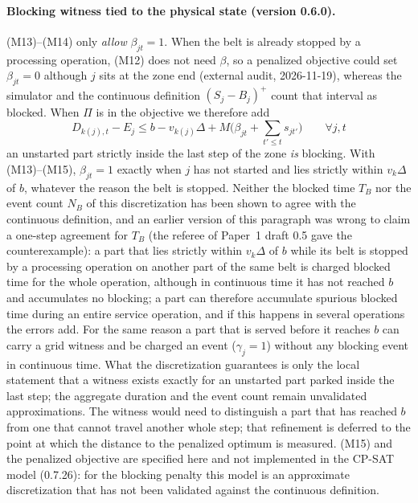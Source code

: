 \documentclass[11pt,a4paper]{article}
\theoremstyle{definition}
\theoremstyle{remark}
\begin{document}
\paragraph{Blocking witness tied to the physical state (version 0.6.0).} (M13)--(M14)
only \emph{allow} $\beta_{jt}=1$. When the belt is already stopped by a processing
operation, (M12) does not need $\beta$, so a penalized objective could set
$\beta_{jt}=0$ although $j$ sits at the zone end (external audit, 2026-11-19), whereas
the simulator and the continuous definition $(S_j-B_j)^+$ count that interval as
blocked. When $\Pi$ is in the objective we therefore add
\begin{equation}
D_{k(j),t}-E_j\le b-v_{k(j)}\Delta+M\Big(\beta_{jt}+\textstyle\sum_{t'\le t}s_{jt'}\Big)
\qquad\forall j,t \tag{M15}
\end{equation}
an unstarted part strictly inside the last step of the zone \emph{is} blocking. With
(M13)--(M15), $\beta_{jt}=1$ exactly when $j$ has not started and lies strictly within
$v_k\Delta$ of $b$, whatever the reason the belt is stopped. Neither the blocked time
$T_B$ nor the event count $N_B$ of this discretization has been shown to agree with the
continuous definition, and an earlier version of this paragraph was wrong to claim a
one-step agreement for $T_B$ (the referee of Paper~1 draft 0.5 gave the
counterexample): a part that lies strictly within $v_k\Delta$ of $b$ while its belt is
stopped by a processing operation on another part of the same belt is charged blocked
time for the whole operation, although in continuous time it has not reached $b$ and
accumulates no blocking; a part can therefore accumulate spurious blocked time during
an entire service operation, and if this happens in several operations the errors add.
For the same reason a part that is served before it reaches $b$ can carry a grid witness
and be charged an event ($\gamma_j=1$) without any blocking event in continuous time.
What the discretization guarantees is only the local statement that a witness exists
exactly for an unstarted part parked inside the last step; the aggregate duration and
the event count remain unvalidated approximations. The witness would need to
distinguish a part that has reached $b$ from one that cannot travel another whole
step; that refinement is deferred to the point at which the distance to the penalized
optimum is measured. (M15) and the penalized
objective are specified here and not implemented in the CP-SAT model (0.7.26): for the
blocking penalty this model is an approximate discretization that has not been
validated against the continuous definition.
\end{document}
